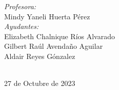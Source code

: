 \begin{titlepage}

\vspace{10mm}
\begin{minipage}{0.7\textwidth}
    \begin{flushleft} \large
        \emph{Profesora:}\\
            Mindy Yaneli Huerta Pérez \\
            \vspace{3mm}
            \emph{Ayudantes:}\\
            Elizabeth Chalnique Ríos Alvarado \\
            Gilbert Raúl Avendaño Aguilar \\
            Aldair Reyes Gónzalez
    \end{flushleft}
\end{minipage}\\

\vspace{10mm}
{\large 27 de Octubre de 2023}\\[2cm]
\vfill 
\end{titlepage}